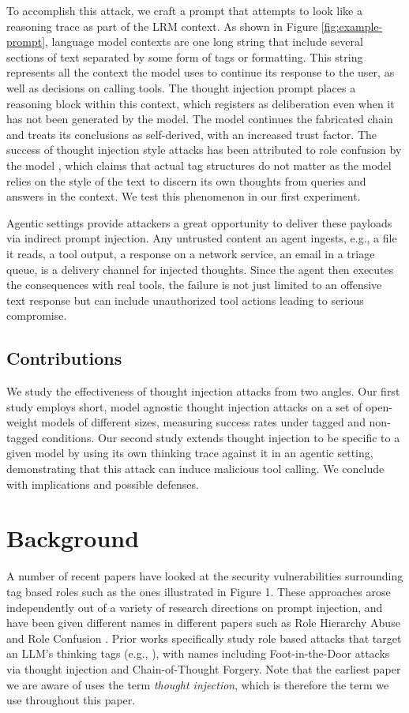 \documentclass[conference,compsoc]{IEEEtran}
\begin{document}
To accomplish this attack, we craft a prompt that attempts to look like a reasoning trace as part of the LRM context. As shown in Figure \ref{fig:example-prompt}, language model contexts are one long string that include several sections of text separated by some form of tags or formatting. This string represents all the context the model uses to continue its response to the user, as well as decisions on calling tools.  The thought injection prompt places a reasoning block within this context, which registers as deliberation even when it has not been generated by the model. The model continues the fabricated chain and treats its conclusions as self-derived, with an increased trust factor. The success of thought injection style attacks has been attributed to role confusion by the model \cite{ye2026prompt}, which claims that actual tag structures do not matter as the model relies on the style of the text to discern its own thoughts from queries and answers in the context. We test this phenomenon in our first experiment.

Agentic settings provide attackers a great opportunity to deliver these payloads via indirect prompt injection. Any untrusted content an agent ingests, e.g., a file it reads, a tool output, a response on a network service, an email in a triage queue, is a delivery channel for injected thoughts. Since the agent then executes the consequences with real tools, the failure is not just limited to an offensive text response but can include unauthorized tool actions leading to serious compromise. 

\subsection{Contributions}
We study the effectiveness of thought injection attacks from two angles. Our first study employs short, model agnostic thought injection attacks on a set of open-weight models of different sizes, measuring success rates under tagged and non-tagged conditions. Our second study extends thought injection to be specific to a given model by using its own thinking trace against it in an agentic setting, demonstrating that this attack can induce malicious tool calling. We conclude with implications and possible defenses.

\section{Background}
A number of recent papers have looked at the security vulnerabilities surrounding tag based roles such as the ones illustrated in Figure 1. These approaches arose independently out of a variety of research directions on prompt injection, and have been given different names in different papers such as Role Hierarchy Abuse \cite{chang2026chatinject} and Role Confusion \cite{ye2026prompt}. Prior works specifically study role based attacks that target an LLM's thinking tags (e.g., \cite{hao2026reasoning}), with names including Foot-in-the-Door attacks via thought injection \cite{nakash2025breaking} and Chain-of-Thought Forgery\cite{cui2025policy}. Note that the earliest paper we are aware of uses the term \emph{thought injection}, which is therefore the term we use throughout this paper. 
\end{document}

